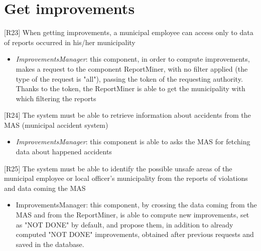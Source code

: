 		\section{Get improvements}
			{[R23]} When getting improvements, a municipal employee can access only to data of reports occurred in his/her municipality
				\begin{itemize}
					\item \textit{ImprovementsManager}: this component, in order to compute improvements, makes a request to the component ReportMiner, with no filter applied (the type of the request is "all"), passing the token of the requesting authority. Thanks to the token, the ReportMiner is able to get the municipality with which filtering the reports
				\end{itemize}
			{[R24]} The system must be able to retrieve information about accidents from the MAS (municipal accident system)
				\begin{itemize}
					\item \textit{ImprovementsManager}: this component is able to asks the MAS for fetching data about happened accidents
				\end{itemize}
		{[R25]} The system must be able to identify the possible unsafe areas of the municipal employee or local officer's municipality from the reports of violations and data coming the MAS
			\begin{itemize}
				\item  ImprovementsManager: this component, by crossing the data coming from the MAS and from the ReportMiner, is able to compute new improvements, set as "NOT DONE" by default, and propose them, in addition to already computed "NOT DONE" improvements, obtained after previous requests and saved in the database.
			\end{itemize}
				